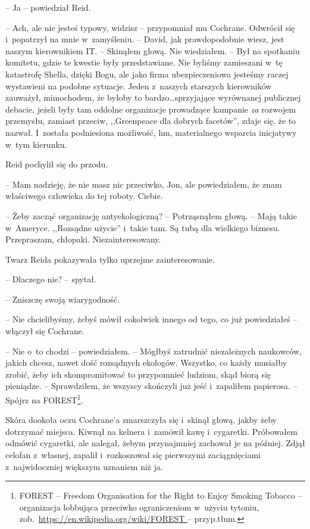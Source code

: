 \documentclass[oneside,polish,11pt,sfheadings]{mwbk}
\begin{document}
-- Ja -- powiedział Reid.

-- Ach, ale nie jesteś typowy, widzisz -- przypomniał mu Cochrane.
Odwrócił się i~popatrzył na mnie w~zamyśleniu. -- David, jak
prawdopodobnie wiesz, jest naszym kierownikiem IT. -- Skinąłem głową. Nie
wiedziałem. -- Był na spotkaniu komitetu, gdzie te kwestie były
przedstawiane. Nie byliśmy zamieszani w~tę katastrofę Shella, dzięki
Bogu, ale jako firma ubezpieczeniowa jesteśmy raczej wystawieni na
podobne sytuacje. Jeden z~naszych starszych kierowników zauważył,
mimochodem, że byłoby to bardzo\ldots sprzyjające wyrównanej publicznej
debacie, jeżeli były tam oddolne organizacje prowadzące kampanie
\emph{za }rozwojem przemysłu, zamiast przeciw, ,,Greenpeace dla dobrych
facetów'', zdaje się, że to nazwał. I~została podniesiona możliwość, hm,
materialnego wsparcia inicjatywy w~tym kierunku.

Reid pochylił się do przodu. 

-- Mam nadzieję, że nie masz nic przeciwko,
Jon, ale powiedziałem, że znam właściwego człowieka do tej roboty. Ciebie.

-- Żeby zacząć organizację antyekologiczną? -- Potrząsnąłem głową. -- Mają
takie w~Ameryce. ,,Rozsądne użycie'' i~takie tam. Są tubą dla wielkiego
biznesu. Przepraszam, chłopaki. Niezainteresowany.

Twarz Reida pokazywała tylko uprzejme zainteresowanie.

-- Dlaczego nie? -- spytał.

-- Zniszczę swoją wiarygodność.

-- Nie chcielibyśmy, żebyś mówił cokolwiek innego od tego, co już
powiedziałeś -- włączył się Cochrane.

-- Nie o~to chodzi -- powiedziałem. -- Mógłbyś zatrudnić niezależnych
naukowców, jakich chcesz, nawet dość rozsądnych ekologów. Wszystko, co
każdy musiałby zrobić, żeby ich skompromitować to przypomnieć ludziom,
skąd biorą się pieniądze. -- Sprawdziłem, że wszyscy skończyli już jeść i~zapaliłem papierosa. -- Spójrz na FOREST\footnote{FOREST -- Freedom
Organisation for the Right to Enjoy Smoking Tobacco -- organizacja
lobbująca przeciwko ograniczeniom w~użyciu tytoniu,
zob.~\url{https://en.wikipedia.org/wiki/FOREST } -- przyp.tłum.}. 

Skóra dookoła oczu Cochrane'a zmarszczyła się i~skinął głową, jakby żeby
dotrzymać miejsca. Kiwnął na kelnera i~zamówił kawę i~cygaretki.
Próbowałem odmówić cygaretki, ale nalegał, żebym przynajmniej zachował
je na później. Zdjął celofan z~własnej, zapalił i~rozkoszował się
pierwszymi zaciągnięciami z~najwidoczniej większym uznaniem niż ja.
\end{document}
